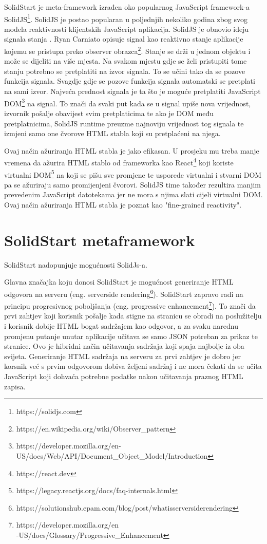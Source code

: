 \documentclass[times, utf8, zavrsni]{fer}
\begin{document}
SolidStart je meta-framework izrađen oko popularnog JavaScript framework-a SolidJS\footnote{https://solidjs.com}. SolidJS je postao popularan u poljednjih nekoliko godina zbog svog modela reaktivnosti klijentskih JavaScript aplikacija.
SolidJS je obnovio ideju signala stanja \citep{ryan2023signal}. Ryan Carniato opisuje signal  kao reaktivno stanje aplikacije kojemu se pristupa preko observer obrazca\footnote{https://en.wikipedia.org/wiki/Observer\_pattern}.
Stanje se drži u jednom objektu i može se dijeliti na više mjesta. Na svakom mjestu gdje se želi pristupiti tome stanju potrebno se pretplatiti na izvor signala. To se učini tako da se pozove funkcija signala.
Svagdje gdje se pozove funkcija signala automatski se pretplati na sami izvor.
Najveća prednost signala je ta što je moguće pretplatiti JavaScript DOM\footnote{https://developer.mozilla.org/en-US/docs/Web/API/Document\_Object\_Model/Introduction} na signal.
To znači da svaki put kada se u signal upiše nova vrijednost, izvornik pošalje obavijest svim pretplaticima te ako je DOM među pretplatnicima, SolidJS runtime preuzme najnoviju vrijednost tog signala te izmjeni samo
one čvorove HTML stabla koji su pretplaćeni na njega.

Ovaj način ažuriranja HTML stabla je jako efikasan. U prosjeku mu treba manje vremena da ažurira HTML stablo od frameworka kao React\footnote{https://react.dev} koji koriste virtualni DOM\footnote{https://legacy.reactjs.org/docs/faq-internals.html} na koji se pišu sve promjene te usporede virtualni i stvarni DOM pa se ažuriraju samo promijenjeni čvorovi.
SolidJS time također rezultira manjim prevedenim JavaScript datotekama jer ne mora s njima slati cijeli virtualni DOM.
Ovaj način ažuriranja HTML stabla je poznat kao "fine-grained reactivity"\citep{ryan2021reactivity}.

\section{SolidStart metaframework}

SolidStart nadopunjuje mogućnosti SolidJs-a.

Glavna značajka koju donosi SolidStart je mogućnost generiranje HTML odgovora na serveru (eng. server\-side rendering\footnote{https://solutionshub.epam.com/blog/post/what\-is\-server\-side\-rendering}).
SolidStart zapravo radi na principu progresivnog poboljšanja (eng. progressive enhancement\footnote{https://developer.mozilla.org/en\\-US/docs/Glossary/Progressive\_Enhancement}).
To znači da prvi zahtjev koji korisnik pošalje kada stigne na stranicu se obradi na poslužitelju i korisnik dobije HTML bogat sadržajem kao odgovor, a za svaku narednu promjenu putanje unutar aplikacije učitava se samo JSON potreban za prikaz te stranice.
Ovo je hibridni način učitavanja sadržaja koji spaja najbolje iz oba svijeta.
Generiranje HTML sadržaja na serveru za prvi zahtjev je dobro jer korsnik već s prvim odgovorom dobiva željeni sadržaj i ne mora čekati da se učita JavaScript koji dohvaća potrebne podatke nakon učitavanja praznog HTML zapisa.
\end{document}
